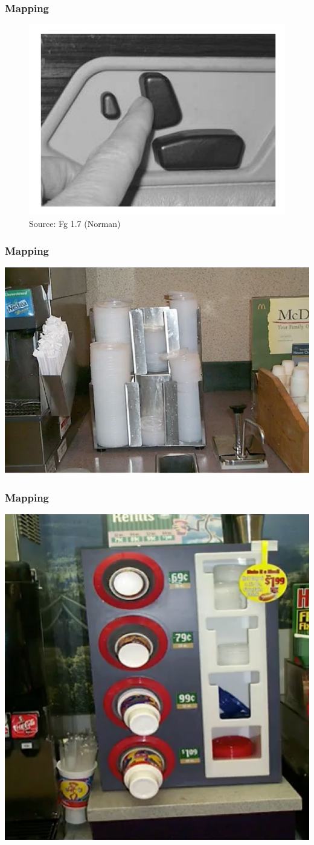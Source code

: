 \documentclass{beamer}
\begin{document}
\begin{frame}
\frametitle{Mapping}
\centering
\begin{figure}
	\includegraphics[width=0.6\linewidth]{map9}
	\caption{Source: Fg 1.7 (Norman)}
\end{figure}

\end{frame}

\begin{frame}
\frametitle{Mapping}
\centering
\includegraphics[width=0.8\linewidth]{map1}
\end{frame}

\begin{frame}
\frametitle{Mapping}
\centering
\includegraphics[width=0.5\linewidth]{map2}
\end{frame}
\end{document}
